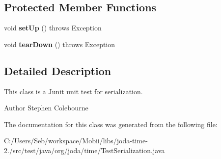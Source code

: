 \subsection*{Protected Member Functions}
\begin{DoxyCompactItemize}
\item 
\hypertarget{classorg_1_1joda_1_1time_1_1_test_serialization_a4fc807dd9f000c61286f0ea7086235e1}{void {\bfseries set\-Up} ()  throws Exception }\label{classorg_1_1joda_1_1time_1_1_test_serialization_a4fc807dd9f000c61286f0ea7086235e1}

\item 
\hypertarget{classorg_1_1joda_1_1time_1_1_test_serialization_a256959f5342368cab33b040a9a83d6e8}{void {\bfseries tear\-Down} ()  throws Exception }\label{classorg_1_1joda_1_1time_1_1_test_serialization_a256959f5342368cab33b040a9a83d6e8}

\end{DoxyCompactItemize}


\subsection{Detailed Description}
This class is a Junit unit test for serialization.

\begin{DoxyAuthor}{Author}
Stephen Colebourne 
\end{DoxyAuthor}


The documentation for this class was generated from the following file\-:\begin{DoxyCompactItemize}
\item 
C\-:/\-Users/\-Seb/workspace/\-Mobii/libs/joda-\/time-\/2./src/test/java/org/joda/time/Test\-Serialization.\-java\end{DoxyCompactItemize}
